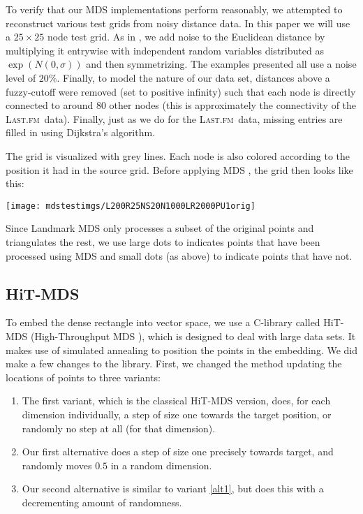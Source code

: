 \documentclass[10pt,fleqn,a4paper]{article}
\newcommand{\lastfm}{\textsc{Last.fm}}
\begin{document}
\begin{twocolumn}
To verify that our MDS implementations perform reasonably, we attempted to reconstruct various test grids from noisy distance data.  In this paper we will use a $25 \times 25$ node test grid.  As in \cite{desilva:sms}, we add noise to the Euclidean distance by multiplying it entrywise with independent random variables distributed as $\exp(N(0,\sigma))$ and then symmetrizing.  The examples presented all use a noise level of $20\%$.  Finally, to model the nature of our data set, distances above a fuzzy-cutoff were removed (set to positive infinity) such that each node is directly connected to around 80 other nodes (this is approximately the connectivity of the \lastfm~data).  Finally, just as we do for the \lastfm~data, missing entries are filled in using Dijkstra's algorithm.

The grid is visualized with grey lines.  Each node is also colored according to the position it had in the source grid. Before applying MDS , the grid then looks like this:\\
\begin{center}\texttt{[image: mdstestimgs/L200R25NS20N1000LR2000PU1orig]}\end{center}\vspace{2mm}

Since Landmark MDS only processes a subset of the original points and triangulates the rest, we use large dots to indicates points that have been processed using MDS and small dots (as above) to indicate points that have not.

\subsection{HiT-MDS} \label{subsec:hitmds}
To embed the dense rectangle into vector space, we use a C-library called HiT-MDS (High-Throughput MDS \cite{strickert2005htm}), which is designed to deal with large data sets. It makes use of simulated annealing to position the points in the embedding. We did make a few changes to the library. First, we changed the method updating the locations of points to three variants:
\label{pointupdates}
\begin{enumerate}
\item \label{orig} The first variant, which is the classical HiT-MDS version, does, for each dimension individually, a step of size one towards the target position, or randomly no step at all (for that dimension).
\item \label{alt1} Our first alternative does a step of size one precisely towards target, and randomly moves $0.5$ in a random dimension.
\item \label{alt2} Our second alternative is similar to variant \ref{alt1}, but does this with a decrementing amount of randomness.
\end{enumerate}


\end{twocolumn}
\end{document}
